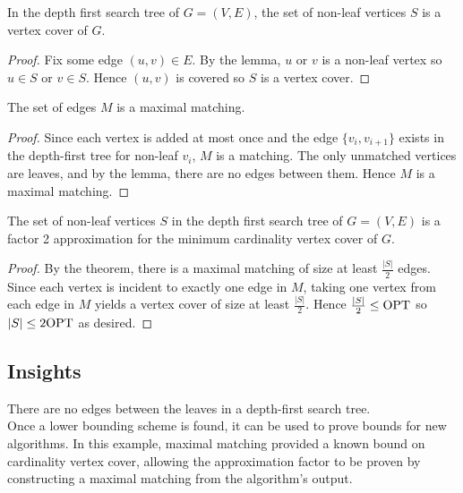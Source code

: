 \documentclass{article}
\begin{document}
\begin{lemma*}
    In the depth first search tree of $G = (V, E)$, the set of non-leaf vertices $S$ is a 
    vertex cover of $G$.
\end{lemma*}

\begin{proof}
    Fix some edge $(u, v) \in E$. By the lemma, $u$ or $v$ is a non-leaf vertex so 
    $u \in S$ or $v \in S$. Hence $(u, v)$ is covered so $S$ is a vertex cover.
\end{proof}

\begin{theorem*}
    The set of edges $M$ is a maximal matching.
\end{theorem*}

\begin{proof}
    Since each vertex is added at most once and the edge $\{v_i, v_{i+1}\}$ exists in 
    the depth-first tree for non-leaf $v_i$, $M$ is a matching. The only unmatched 
    vertices are leaves, and by the lemma, there are no edges between them. Hence $M$ is
    a maximal matching.
\end{proof}

\begin{theorem*}
    The set of non-leaf vertices $S$ in the depth first search tree of $G = (V, E)$ is a 
    factor 2 approximation for the minimum cardinality vertex cover of $G$.
\end{theorem*}

\begin{proof}
    By the theorem, there is a maximal matching of size at least $\frac{|S|}{2}$ 
    edges. Since each vertex is incident to exactly one edge in $M$, taking one vertex
    from each edge in $M$ yields a vertex cover of size at least $\frac{|S|}{2}$. Hence
    $\frac{|S|}{2} \leq \mathrm{OPT}$ so $|S| \leq 2 \mathrm{OPT}$ as desired.
\end{proof}

\subsection*{Insights}

There are no edges between the leaves in a depth-first search tree. \\

Once a lower bounding scheme is found, it can be used to prove bounds for new 
algorithms. In this example, maximal matching provided a known bound on cardinality 
vertex cover, allowing the approximation factor to be proven by constructing a maximal 
matching from the algorithm's output. 
\end{document}
